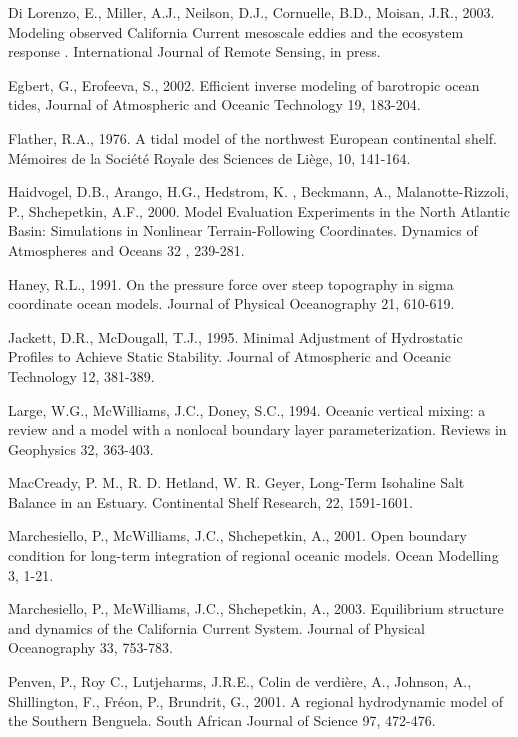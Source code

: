 Di Lorenzo, E., Miller, A.J., Neilson, D.J., 
Cornuelle, B.D., Moisan, J.R.,
2003.
Modeling observed California Current mesoscale eddies and 
the ecosystem response .
International Journal of Remote Sensing,
in press.

Egbert, G., Erofeeva, S., 2002.
Efficient inverse modeling of barotropic ocean tides, 
Journal of Atmospheric and Oceanic Technology
19,
183-204.

Flather, R.A., 1976.
A tidal model of the northwest European continental shelf.
M\'emoires de la Soci\'et\'e Royale des Sciences de Li\`ege, 
10, 
141-164.

Haidvogel, D.B., Arango, H.G., Hedstrom, K. , Beckmann, A.,
Malanotte-Rizzoli, P., Shchepetkin, A.F.,
2000.
Model Evaluation Experiments in the North Atlantic Basin:
Simulations in Nonlinear Terrain-Following Coordinates.
Dynamics of Atmospheres and Oceans
32 ,
239-281.

Haney, R.L.,
1991.
On the pressure force over steep
topography in sigma coordinate ocean models.
Journal of Physical Oceanography
21,
610-619.

Jackett, D.R., McDougall, T.J.,
1995.
Minimal Adjustment of Hydrostatic Profiles to 
Achieve Static Stability.
Journal of Atmospheric and Oceanic Technology
12,
381-389.

Large, W.G., McWilliams, J.C., Doney, S.C.,
1994.
Oceanic vertical mixing: a review and a model
with a nonlocal boundary layer parameterization.
Reviews in Geophysics
32,
363-403.

MacCready, P. M., R. D. Hetland, W. R. Geyer, 
Long-Term Isohaline Salt Balance in an Estuary. 
Continental Shelf Research, 22, 1591-1601.

Marchesiello, P., McWilliams, J.C., Shchepetkin, A.,
2001.
Open boundary condition for long-term integration of regional oceanic
models.
Ocean Modelling
3,
1-21.

Marchesiello, P., McWilliams, J.C., Shchepetkin, A.,
2003.
Equilibrium structure and dynamics of the California Current System.
Journal of Physical Oceanography
33,
753-783.

Penven, P., Roy C., Lutjeharms, J.R.E., 
Colin de verdi\`ere, A., Johnson, A., Shillington, F.,
Fr\'eon, P., Brundrit, G.,
2001.
A regional hydrodynamic model of the Southern Benguela.
South African Journal of Science
97,
472-476.

